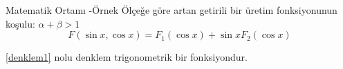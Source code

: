\documentclass[pdf]{beamer}
\begin{document}
\begin{frame}{Matematik Ortamı -Örnek}
Ölçeğe göre artan getirili bir üretim fonksiyonunun koşulu: $\alpha + \beta > 1$ \newline
\begin{equation} \label{denklem1}
F(\sin x, \cos x)=F_1(\cos x) + \sin x F_2(\cos x)
\end{equation} \newline

\ref{denklem1} nolu denklem trigonometrik bir fonksiyondur.
\end{frame}
\end{document}
